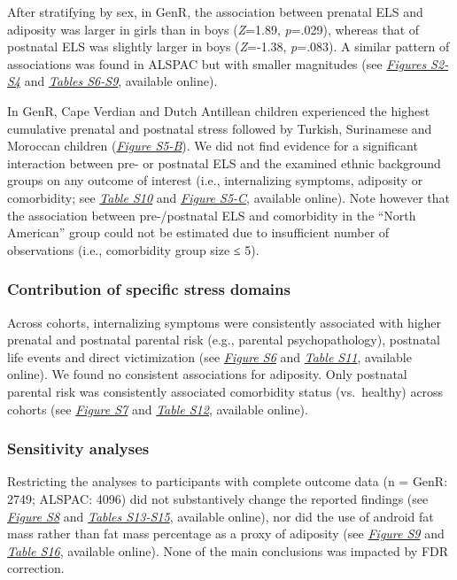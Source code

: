 \documentclass[
  letterpaper,
  DIV=11,
  numbers=noendperiod]{scrreport}
\begin{document}
After stratifying by sex, in GenR, the association between prenatal ELS
and adiposity was larger in girls than in boys (\emph{Z}=1.89,
\emph{p}=.029), whereas that of postnatal ELS was slightly larger in
boys (\emph{Z}=-1.38, \emph{p}=.083). A similar pattern of associations
was found in ALSPAC but with smaller magnitudes (see
\href{https://osf.io/xs29c}{\emph{Figures S2-S4}} and
\href{https://osf.io/7e4x8}{\emph{Tables S6-S9}}, available online).

In GenR, Cape Verdian and Dutch Antillean children experienced the
highest cumulative prenatal and postnatal stress followed by Turkish,
Surinamese and Moroccan children
(\href{https://osf.io/xs29c}{\emph{Figure S5-B}}). We did not find
evidence for a significant interaction between pre- or postnatal ELS and
the examined ethnic background groups on any outcome of interest (i.e.,
internalizing symptoms, adiposity or comorbidity; see
\href{https://osf.io/7e4x8}{\emph{Table S10}} and
\href{https://osf.io/xs29c}{\emph{Figure S5-C}}, available online). Note
however that the association between pre-/postnatal ELS and comorbidity
in the ``North American'' group could not be estimated due to
insufficient number of observations (i.e., comorbidity group size ≤ 5).

\subsubsection{Contribution of specific stress
domains}\label{contribution-of-specific-stress-domains}

Across cohorts, internalizing symptoms were consistently associated with
higher prenatal and postnatal parental risk (e.g., parental
psychopathology), postnatal life events and direct victimization (see
\href{https://osf.io/xs29c}{\emph{Figure S6}} and
\href{https://osf.io/7e4x8}{\emph{Table S11}}, available online). We
found no consistent associations for adiposity. Only postnatal parental
risk was consistently associated comorbidity status (vs.~healthy) across
cohorts (see \href{https://osf.io/xs29c}{\emph{Figure S7}} and
\href{https://osf.io/7e4x8}{\emph{Table S12}}, available online).

\subsubsection{Sensitivity analyses}\label{sensitivity-analyses}

Restricting the analyses to participants with complete outcome data (n =
GenR: 2749; ALSPAC: 4096) did not substantively change the reported
findings (see \href{https://osf.io/xs29c}{\emph{Figure S8}} and
\href{https://osf.io/7e4x8}{\emph{Tables S13-S15}}, available online),
nor did the use of android fat mass rather than fat mass percentage as a
proxy of adiposity (see \href{https://osf.io/xs29c}{\emph{Figure S9}}
and \href{https://osf.io/7e4x8}{\emph{Table S16}}, available online).
None of the main conclusions was impacted by FDR correction.
\end{document}
